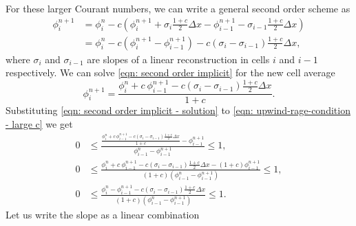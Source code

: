 \documentclass[../thesis.tex]{subfiles}
\begin{document}
For these larger Courant numbers, we can write a general second order scheme as
\begin{equation}\label{eqn: second order implicit}
    \begin{split}
        \phi_{i}^{n+1}
        &= \phi_{i}^{n} - c\left(
            \phi_{i}^{n+1}
            + \sigma_{i}\frac{1+c}{2}\Delta x - \phi_{i-1}^{n+1}
            -\sigma_{i-1}\frac{1+c}{2}\Delta x \right)
        \\
        &= \phi_{i}^{n} - c\left(
            \phi_{i}^{n+1}
            - \phi_{i-1}^{n+1}
            \right)
            -c\left(
            \sigma_{i} - \sigma_{i-1}
            \right)\frac{1+c}{2}\Delta x,
    \end{split}
\end{equation}
where \(\sigma_{i}\) and \(\sigma_{i-1}\) are slopes of a linear reconstruction in cells \(i\) and \(i-1\) respectively. We can solve \eqref{eqn: second order implicit} for the
new cell average
\begin{equation}\label{eqn: second order implicit - solution}
    \phi_{i}^{n+1} =
    \frac{\phi_{i}^{n} +
    c~\phi_{i-1}^{n+1}-c\left(
        \sigma_{i} - \sigma_{i-1}
        \right)\frac{1+c}{2}\Delta x}{1+c}.
\end{equation}
Substituting \eqref{eqn: second order implicit - solution} to \eqref{eqn: upwind-rage-condition - large c} we get
\begin{equation}
    \begin{split}
        0
        &\leq
        \frac{\frac{\phi_{i}^{n} +
        c~\phi_{i-1}^{n+1}-c\left(
            \sigma_{i} - \sigma_{i-1}
            \right)\frac{1+c}{2}\Delta x}{1+c} - \phi_{i-1}^{n+1}}{\phi_{i-1}^{n} - \phi_{i-1}^{n+1}}
        \leq
        1,
        \\
        0
        &\leq
        \frac{\phi_{i}^{n} +
        c~\phi_{i-1}^{n+1}-c\left(
            \sigma_{i} - \sigma_{i-1}
            \right)\frac{1+c}{2}\Delta x - (1+c)\phi_{i-1}^{n+1}}
            {(1+c)\left( \phi_{i-1}^{n} - \phi_{i-1}^{n+1} \right)}
        \leq
        1,
        \\
        0
        &\leq
        \frac{\phi_{i}^{n} - \phi_{i-1}^{n+1}
        -c\left(
            \sigma_{i} - \sigma_{i-1}
            \right)\frac{1+c}{2}\Delta x}
            {(1+c)\left( \phi_{i-1}^{n} - \phi_{i-1}^{n+1} \right)}
        \leq
        1.
    \end{split}
\end{equation}
Let us write the slope as a linear combination
\end{document}
